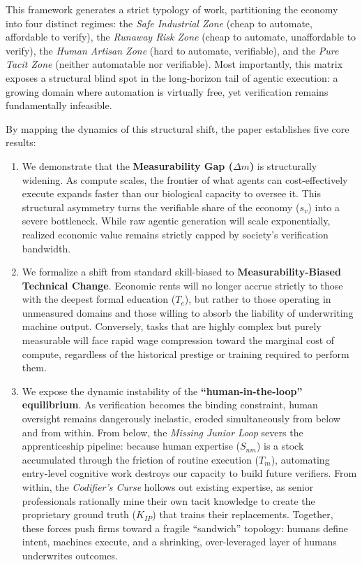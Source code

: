 \documentclass[12pt, letter]{article}
\begin{document}
This framework generates a strict typology of work, partitioning the economy into four distinct regimes: the \emph{Safe Industrial Zone} (cheap to automate, affordable to verify), the \emph{Runaway Risk Zone} (cheap to automate, unaffordable to verify), the \emph{Human Artisan Zone} (hard to automate, verifiable), and the \emph{Pure Tacit Zone} (neither automatable nor verifiable).  Most importantly, this matrix exposes a structural blind spot in the long-horizon tail of agentic execution: a growing domain where automation is virtually free, yet verification remains fundamentally infeasible.

By mapping the dynamics of this structural shift, the paper establishes five core results:

\begin{enumerate}
    \item We demonstrate that the \textbf{Measurability Gap ($\Delta m$)} is structurally widening. As compute scales, the frontier of what agents can cost-effectively execute expands faster than our biological capacity to oversee it. This structural asymmetry turns the verifiable share of the economy ($s_v$) into a severe bottleneck. While raw agentic generation will scale exponentially, realized economic value remains strictly capped by society's verification bandwidth.
    
    \item We formalize a shift from standard skill-biased to \textbf{Measurability-Biased Technical Change}. Economic rents will no longer accrue strictly to those with the deepest formal education ($T_e$), but rather to those operating in unmeasured domains and those willing to absorb the liability of underwriting machine output. Conversely, tasks that are highly complex but purely measurable will face rapid wage compression toward the marginal cost of compute, regardless of the historical prestige or training required to perform them.
    
    \item We expose the dynamic instability of the \textbf{``human-in-the-loop'' equilibrium}. As verification becomes the binding constraint, human oversight remains dangerously inelastic, eroded simultaneously from below and from within. From below, the \emph{Missing Junior Loop} severs the apprenticeship pipeline: because human expertise ($S_{nm}$) is a stock accumulated through the friction of routine execution ($T_m$), automating entry-level cognitive work destroys our capacity to build future verifiers. From within, the \emph{Codifier's Curse} hollows out existing expertise, as senior professionals rationally mine their own tacit knowledge to create the proprietary ground truth ($K_{IP}$) that trains their replacements. Together, these forces push firms toward a fragile ``sandwich'' topology: humans define intent, machines execute, and a shrinking, over-leveraged layer of humans underwrites outcomes. 
    

\end{enumerate}
\end{document}
